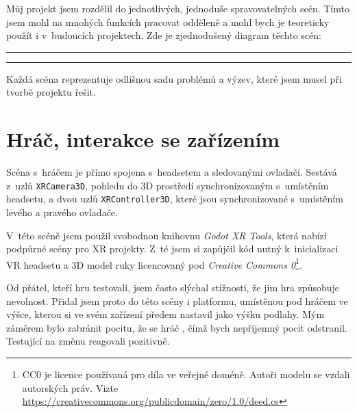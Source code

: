 \begin{samepage}
  Můj projekt jsem rozdělil do jednotlivých, jednoduše spravovatelných scén. Tímto jsem mohl na mnohých funkcích pracovat odděleně a mohl bych je teoreticky použít i v~budoucích projektech. Zde je zjednodušený diagram těchto scén:

  \vspace{1em}
  \hrule
  \vspace{1em}

  \renewcommand\DTstyle{\sffamily}
  \vspace{1em}
  \hrule
  \vspace{1em}

  Každá scéna reprezentuje odlišnou sadu problémů a výzev, které jsem musel při tvorbě projektu řešit.
\end{samepage}

\section{Hráč, interakce se zařízením}

Scéna s~hráčem je přímo spojena s~headsetem a sledovanými ovladači. Sestává z~uzlů \texttt{XRCamera3D}, pohledu do 3D prostředí synchronizovaným s~umístěním headsetu, a dvou uzlů \texttt{XRController3D}, které jsou synchronizované s~umístěním levého a pravého ovladače.

V~této scéně jsem použil svobodnou knihovnu \textit{Godot XR Tools}, která nabízí podpůrné scény pro XR projekty. Z~té jsem si zapůjčil kód nutný k~inicializaci VR headsetu a 3D model ruky licencovaný pod \textit{Creative Commons 0}\footnote{CC0 je licence používaná pro díla ve veřejné doméně. Autoři modelu se vzdali autorských práv. Vizte \url{https://creativecommons.org/publicdomain/zero/1.0/deed.cs}}.

Od přátel, kteří hru testovali, jsem často slýchal stížnosti, že jim hra způsobuje nevolnost. Přidal jsem proto do této scény i platformu, umístěnou pod hráčem ve výšce, kterou si ve svém zařízení předem nastavil jako výšku podlahy. Mým záměrem bylo zabránit pocitu, že se hráč , čímž bych nepříjemný pocit odstranil. Testující na změnu reagovali pozitivně. 

